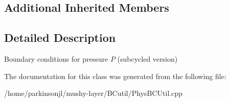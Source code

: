 \subsection*{Additional Inherited Members}


\subsection{Detailed Description}
Boundary conditions for pressure $ P $ (subcycled version) 

The documentation for this class was generated from the following file\+:\begin{DoxyCompactItemize}
\item 
/home/parkinsonjl/mushy-\/layer/\+B\+Cutil/Phys\+B\+C\+Util.\+cpp\end{DoxyCompactItemize}
